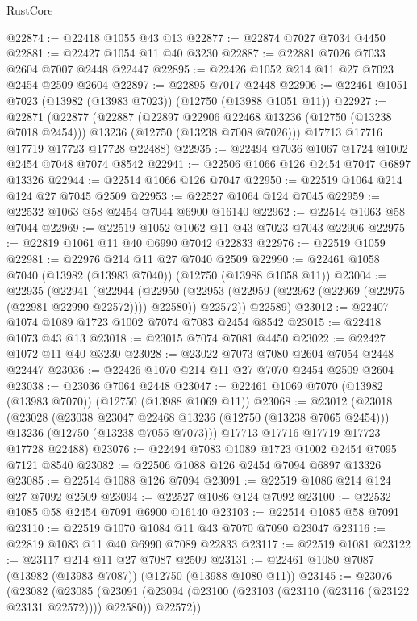 \begin{lexlean}{RustCore}
\begin{coremodule}
@22874 := @22418 @1055 @43 @13
@22877 := @22874 @7027 @7034 @4450
@22881 := @22427 @1054 @11 @40 @3230
@22887 := @22881 @7026 @7033 @2604 @7007 @2448 @22447
@22895 := @22426 @1052 @214 @11 @27 @7023 @2454 @2509 @2604
@22897 := @22895 @7017 @2448
@22906 := @22461 @1051 @7023 (@13982 (@13983 @7023)) (@12750 (@13988 @1051 @11))
@22927 := @22871
    (@22877
      (@22887
        (@22897 @22906 @22468 @13236 (@12750 (@13238 @7018 @2454)))
        @13236
        (@12750 (@13238 @7008 @7026)))
      @17713
      @17716
      @17719
      @17723
      @17728
      @22488)
@22935 := @22494 @7036 @1067 @1724 @1002 @2454 @7048 @7074 @8542
@22941 := @22506 @1066 @126 @2454 @7047 @6897 @13326
@22944 := @22514 @1066 @126 @7047
@22950 := @22519 @1064 @214 @124 @27 @7045 @2509
@22953 := @22527 @1064 @124 @7045
@22959 := @22532 @1063 @58 @2454 @7044 @6900 @16140
@22962 := @22514 @1063 @58 @7044
@22969 := @22519 @1052 @1062 @11 @43 @7023 @7043 @22906
@22975 := @22819 @1061 @11 @40 @6990 @7042 @22833
@22976 := @22519 @1059
@22981 := @22976 @214 @11 @27 @7040 @2509
@22990 := @22461 @1058 @7040 (@13982 (@13983 @7040)) (@12750 (@13988 @1058 @11))
@23004 := @22935
    (@22941
      (@22944
        (@22950 (@22953 (@22959 (@22962 (@22969 (@22975 (@22981 @22990 @22572)))) @22580)) @22572))
      @22589)
@23012 := @22407 @1074 @1089 @1723 @1002 @7074 @7083 @2454 @8542
@23015 := @22418 @1073 @43 @13
@23018 := @23015 @7074 @7081 @4450
@23022 := @22427 @1072 @11 @40 @3230
@23028 := @23022 @7073 @7080 @2604 @7054 @2448 @22447
@23036 := @22426 @1070 @214 @11 @27 @7070 @2454 @2509 @2604
@23038 := @23036 @7064 @2448
@23047 := @22461 @1069 @7070 (@13982 (@13983 @7070)) (@12750 (@13988 @1069 @11))
@23068 := @23012
    (@23018
      (@23028
        (@23038 @23047 @22468 @13236 (@12750 (@13238 @7065 @2454)))
        @13236
        (@12750 (@13238 @7055 @7073)))
      @17713
      @17716
      @17719
      @17723
      @17728
      @22488)
@23076 := @22494 @7083 @1089 @1723 @1002 @2454 @7095 @7121 @8540
@23082 := @22506 @1088 @126 @2454 @7094 @6897 @13326
@23085 := @22514 @1088 @126 @7094
@23091 := @22519 @1086 @214 @124 @27 @7092 @2509
@23094 := @22527 @1086 @124 @7092
@23100 := @22532 @1085 @58 @2454 @7091 @6900 @16140
@23103 := @22514 @1085 @58 @7091
@23110 := @22519 @1070 @1084 @11 @43 @7070 @7090 @23047
@23116 := @22819 @1083 @11 @40 @6990 @7089 @22833
@23117 := @22519 @1081
@23122 := @23117 @214 @11 @27 @7087 @2509
@23131 := @22461 @1080 @7087 (@13982 (@13983 @7087)) (@12750 (@13988 @1080 @11))
@23145 := @23076
    (@23082
      (@23085
        (@23091 (@23094 (@23100 (@23103 (@23110 (@23116 (@23122 @23131 @22572)))) @22580)) @22572))

\end{coremodule}
\end{lexlean}
